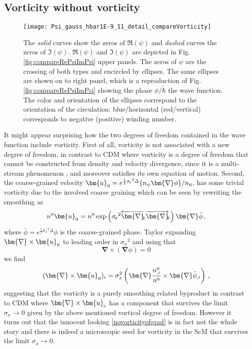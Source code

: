 \documentclass[twocolumn, nofootinbib, showpacs, superscriptaddress]{revtex4-1}
\newcommand{\NEW}[1]{#1}
\renewcommand{\H}[0]{{\textsc{h}}}
\newcommand{\sigx}{{\sigma_{\! x}}}
\newcommand{\thbar}{\tilde\hbar}
\renewcommand{\c}[0]{{\rm{c}}}
\newcommand{\vu}[0]{\bm{u} }
\newcommand{\vnabla}[0]{\bm{\nabla} }
\begin{document}
  \subsection{Vorticity without vorticity}
 \label{Vorticity}
   \begin{figure}[t]
\texttt{[image: Psi\_gauss\_hbar1E-9\_11\_detail\_compareVorticity]}\\
 \caption{The \textit{solid} curves show the zeros of $\Re(\psi)$  and  \textit{dashed} 
 curves the zeros of $\Im(\psi)$. $\Re(\psi)$ and $\Im(\psi)$ are depicted in Fig.\,\ref{fig:compareRePsiImPsi} upper panels. The zeros of $\psi$ are the crossing of both types and encircled by ellipses. The same ellipses are shown on to right panel, which is a reproduction of Fig.\,\ref{fig:compareRePsiImPsi} showing the phase $\phi/\thbar$ the wave function. The color and orientation of the ellipses correspond
 to the orientation of the circulation: blue/horizontal (red/vertical) corresponds to negative (positive) winding number.}
\label{fig:compareVorticity}
\end{figure}
%
 It might appear surprising how the two degrees of freedom contained in the wave function include vorticity. 
 First of all, vorticity is not associated with a new degree of freedom, in contrast to CDM where vorticity is a degree of freedom that cannot be 
constructed from density and velocity divergence,  \NEW{since it is a multi-stream phenomenon \cite{PichonBernardeau1999,PueblasScoccimarro2009, HahnAnguloAbel2015}}, and  moreover satisfies its own equation of motion.
 Second, the coarse-grained velocity $\vu_\H =  e^{\frac{1}{2}\sigx^2 \Delta} \{n_\psi \vnabla \phi \}/n_\H$, has some trivial vorticity due to the involved coarse graining which can be seen by rewriting the smoothing as 
 \begin{equation}
 n^\H \vu_\H = n^\H \exp\left(\sigx^2\overleftarrow{\vnabla}_{\! \!  x}\overrightarrow{\vnabla}_{\! \!  x}\right) \vnabla \bar \phi\,, \label{Husimiconstr}
  \end{equation}
  where $\bar \phi = e^{\frac{1}{2}\sigx^2 \Delta} \phi $ is the coarse-grained phase.
 Taylor expanding  $\vnabla \times \vu_\H$  to leading order in $\sigx^2$ and using that 
 \begin{equation}
 \vnabla \times (\vnabla \phi) =0  \label{novorticityofgrad}
 \end{equation}
  we find
 \begin{align} \label{curlofv}
 (\vnabla \times \vu_\H)_i = \sigma_x^2 \left(\vnabla\frac{  n_{,i}^\H}{n^\H}\times  \vnabla \bar \phi_{,i}  \right)\,,
\end{align} 
 suggesting that the vorticity is a purely smoothing related byproduct in contrast to CDM where $\vnabla \times \vu_\c$ has a component that survives the limit $\sigx \rightarrow 0$ given by the above mentioned vortical degree of freedom. 
However it turns out that the innocent looking \eqref{novorticityofgrad} is in fact not the whole story 
and there is indeed a microscopic seed for vorticity in the ScM that survives the limit  $\sigx \rightarrow 0$. 
\end{document}
